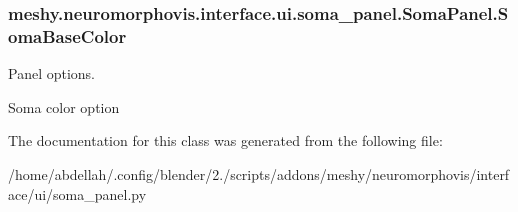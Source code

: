 \subsubsection[{\texorpdfstring{Soma\+Base\+Color}{SomaBaseColor}}]{\setlength{\rightskip}{0pt plus 5cm}meshy.\+neuromorphovis.\+interface.\+ui.\+soma\+\_\+panel.\+Soma\+Panel.\+Soma\+Base\+Color\hspace{0.3cm}{\ttfamily [static]}}\hypertarget{classmeshy_1_1neuromorphovis_1_1interface_1_1ui_1_1soma__panel_1_1SomaPanel_aa9c4cd75de7f3570fc264a1408020830}{}\label{classmeshy_1_1neuromorphovis_1_1interface_1_1ui_1_1soma__panel_1_1SomaPanel_aa9c4cd75de7f3570fc264a1408020830}


Panel options. 

Soma color option 

The documentation for this class was generated from the following file\+:\begin{DoxyCompactItemize}
\item 
/home/abdellah/.\+config/blender/2./scripts/addons/meshy/neuromorphovis/interface/ui/soma\+\_\+panel.\+py\end{DoxyCompactItemize}

